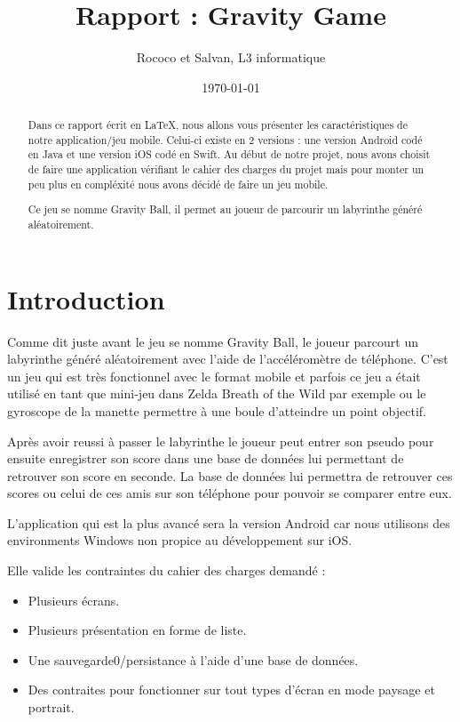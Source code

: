 \documentclass{article}
\title{Rapport : Gravity Game}
\author{Rococo et Salvan, L3 informatique}
\date{\today}
\begin{document}
\maketitle %


\begin{abstract}
  Dans ce rapport écrit en \LaTeX, nous allons vous présenter les caractéristiques de notre application/jeu mobile. Celui-ci existe en 2 versions : une version Android codé en Java et une version iOS codé en Swift. Au début de notre projet, nous avons choisit de faire une application vérifiant le cahier des charges du projet mais pour monter un peu plus en compléxité nous avons décidé de faire un jeu mobile.
 
  Ce jeu se nomme Gravity Ball, il permet au joueur de parcourir  un labyrinthe généré aléatoirement.
\end{abstract}
\newpage
\tableofcontents
\newpage
\section{Introduction}
\label{section:intro} %
Comme dit juste avant le jeu se nomme Gravity Ball, le joueur parcourt un labyrinthe généré aléatoirement avec l'aide de l'accéléromètre  de téléphone. C'est un jeu qui est très fonctionnel avec le format mobile et parfois ce jeu a était utilisé en tant que mini-jeu dans Zelda Breath of the Wild par exemple ou le gyroscope de la manette permettre à une boule d'atteindre un point objectif.

Après avoir reussi à passer le labyrinthe le joueur peut entrer son pseudo pour ensuite enregistrer son score dans une base de données lui permettant de retrouver son score en seconde. La base de données lui permettra de retrouver ces scores ou celui de ces amis sur son téléphone pour pouvoir se comparer entre eux.

L'application qui est la plus avancé sera la version Android car nous utilisons des environments Windows non propice au développement sur iOS. 

Elle valide les contraintes du cahier des charges demandé :
\begin{itemize}
\item Plusieurs écrans.
\item Plusieurs présentation en forme de liste.
\item Une sauvegarde0/persistance à l'aide d'une base de données.
\item Des contraites pour fonctionner sur tout types d'écran en mode paysage et portrait.
\end{itemize}
\end{document}

